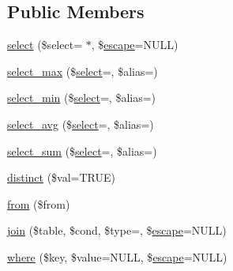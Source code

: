 \subsection*{Public Members}
\begin{DoxyCompactItemize}
\item 
\mbox{\hyperlink{class_c_i___d_b__query__builder_a406a7ea81e717e56496f61baf3e03f44}{select}} (\$select=\textquotesingle{} $\ast$\textquotesingle{}, \$\mbox{\hyperlink{class_c_i___d_b__driver_ac8f37ca5703d4558c732e692194f8cd6}{escape}}=N\+U\+LL)
\item 
\mbox{\hyperlink{class_c_i___d_b__query__builder_a4eac30ba8703ba8f62664e3b4ea1a177}{select\+\_\+max}} (\$\mbox{\hyperlink{class_c_i___d_b__query__builder_a406a7ea81e717e56496f61baf3e03f44}{select}}=\textquotesingle{}\textquotesingle{}, \$alias=\textquotesingle{}\textquotesingle{})
\item 
\mbox{\hyperlink{class_c_i___d_b__query__builder_ab8cf650dd779435da91d6f50bf082528}{select\+\_\+min}} (\$\mbox{\hyperlink{class_c_i___d_b__query__builder_a406a7ea81e717e56496f61baf3e03f44}{select}}=\textquotesingle{}\textquotesingle{}, \$alias=\textquotesingle{}\textquotesingle{})
\item 
\mbox{\hyperlink{class_c_i___d_b__query__builder_a0377f6833e394c977823e21413772761}{select\+\_\+avg}} (\$\mbox{\hyperlink{class_c_i___d_b__query__builder_a406a7ea81e717e56496f61baf3e03f44}{select}}=\textquotesingle{}\textquotesingle{}, \$alias=\textquotesingle{}\textquotesingle{})
\item 
\mbox{\hyperlink{class_c_i___d_b__query__builder_a42348c349cf2fa7ca0210087efcf98d3}{select\+\_\+sum}} (\$\mbox{\hyperlink{class_c_i___d_b__query__builder_a406a7ea81e717e56496f61baf3e03f44}{select}}=\textquotesingle{}\textquotesingle{}, \$alias=\textquotesingle{}\textquotesingle{})
\item 
\mbox{\hyperlink{class_c_i___d_b__query__builder_a65b172f03eea17b7fa243f5732a592bd}{distinct}} (\$val=T\+R\+UE)
\item 
\mbox{\hyperlink{class_c_i___d_b__query__builder_a91f5f004ed8e2237a4decc5d23ac3457}{from}} (\$from)
\item 
\mbox{\hyperlink{class_c_i___d_b__query__builder_a54557b1ef757507cbbd2a8802a99810b}{join}} (\$table, \$cond, \$type=\textquotesingle{}\textquotesingle{}, \$\mbox{\hyperlink{class_c_i___d_b__driver_ac8f37ca5703d4558c732e692194f8cd6}{escape}}=N\+U\+LL)
\item 
\mbox{\hyperlink{class_c_i___d_b__query__builder_a2356c4b7b93fb83c62a354a8a0748222}{where}} (\$key, \$value=N\+U\+LL, \$\mbox{\hyperlink{class_c_i___d_b__driver_ac8f37ca5703d4558c732e692194f8cd6}{escape}}=N\+U\+LL)

\end{DoxyCompactItemize}
